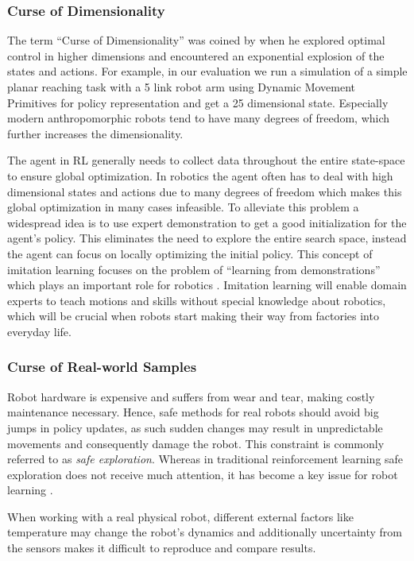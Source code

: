 \subsubsection{Curse of Dimensionality}
The term ``Curse of Dimensionality'' was coined by \citet{Bellman:1957} when
he explored optimal control in higher dimensions and encountered
an exponential explosion of the states and actions.
For example, in our evaluation we run a simulation of a
simple planar reaching task
with a 5 link robot arm using Dynamic Movement Primitives \citep{ijspeert2002learning}
for policy representation and get a 25 dimensional state.
Especially modern anthropomorphic robots tend to have many degrees of
freedom, which further increases the dimensionality.

The agent in RL generally needs to collect data throughout the entire
state-space to ensure global optimization. In robotics the agent
often has to deal with high dimensional states and actions
due to many degrees of freedom which makes this global optimization
in many cases infeasible.
To alleviate this problem  a widespread idea is to use expert demonstration
to get a good initialization for the agent's policy. This
eliminates the need to explore the entire search space, instead the
agent can focus on locally optimizing the initial policy.
This concept of imitation learning focuses on the problem of ``learning
from demonstrations'' which plays an important role
for robotics \citep{Osaetal18}. Imitation learning
will enable domain experts to teach motions and
skills without special knowledge about robotics, which will be crucial
when robots start making their way from factories into everyday life.

\subsubsection{Curse of Real-world Samples}
Robot hardware is expensive and suffers from wear and tear, making
costly maintenance necessary. Hence, safe methods for real robots
should avoid big jumps in policy updates, as such sudden changes may
result in unpredictable movements and consequently damage the robot.
This constraint is commonly referred to as \textit{safe exploration}.
Whereas in traditional reinforcement learning
safe exploration does not receive much attention,
it has become a key issue for robot learning \citep{schneider1997exploiting}.

When working with a real physical robot,
different external factors like temperature may change the robot's
dynamics and
additionally uncertainty from the sensors makes it difficult to reproduce and
compare results.

